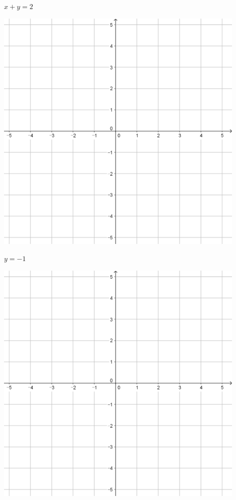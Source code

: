 \documentclass{oblivoir}
\begin{document}
\begin{minipage}{0.45\textwidth}\centering
\(x+y=2\)
\par\bigskip\includegraphics[width=0.9\textwidth]{55}
\end{minipage}
\begin{minipage}{0.45\textwidth}\centering
\(y=-1\)
\par\bigskip\includegraphics[width=0.9\textwidth]{55}
\end{minipage}\bigskip\bigskip\par
\end{document}
